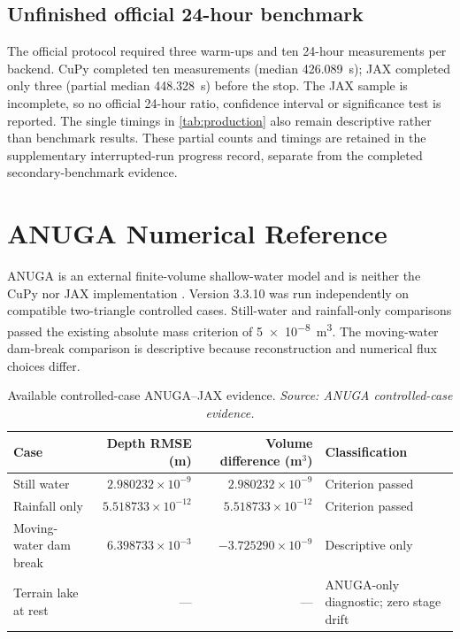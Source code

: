 \documentclass[11pt,a4paper,oneside]{report}
\newcommand{\anugasource}{\textit{Source: ANUGA controlled-case evidence.}}
\begin{document}
\newpage

\section{Unfinished official 24-hour benchmark}
\enlargethispage{4\baselineskip}
The official protocol required three warm-ups and ten 24-hour measurements per backend.
CuPy completed ten measurements (median \SI{426.089}{\second}); JAX completed only three
(partial median \SI{448.328}{\second}) before the stop. The JAX sample is incomplete, so no
official 24-hour ratio, confidence interval or significance test is reported. The single
timings in \cref{tab:production} also remain descriptive rather than benchmark results. These
partial counts and timings are retained in the supplementary interrupted-run progress record,
separate from the completed secondary-benchmark evidence.

\chapter{ANUGA Numerical Reference}\label{chap:anuga}
ANUGA is an external finite-volume shallow-water model and is neither the CuPy nor JAX
implementation \cite{anuga,zoppou1999}. Version 3.3.10 was run independently on compatible
two-triangle controlled cases. Still-water and rainfall-only comparisons passed the existing
absolute mass criterion of \SI{5e-8}{\cubic\metre}. The moving-water dam-break comparison is
descriptive because reconstruction and numerical flux choices differ.

\begin{table}[H]
\centering
\caption[Controlled-case ANUGA--JAX evidence.]{Available controlled-case ANUGA--JAX
evidence. \anugasource}
\label{tab:anuga}
\footnotesize
\begin{tabularx}{\textwidth}{|X|r|r|X|}
\hline
\textbf{Case} & \textbf{Depth RMSE (m)} & \textbf{Volume difference (m$^3$)} &
\textbf{Classification} \\
\hline\hline
Still water & $2.980232\times10^{-9}$ & $2.980232\times10^{-9}$ & Criterion passed \\ \hdashline[0.4pt/1.2pt]
Rainfall only & $5.518733\times10^{-12}$ & $5.518733\times10^{-12}$ & Criterion passed \\ \hdashline[0.4pt/1.2pt]
Moving-water dam break & $6.398733\times10^{-3}$ & $-3.725290\times10^{-9}$ & Descriptive only \\ \hdashline[0.4pt/1.2pt]
Terrain lake at rest & --- & --- & ANUGA-only diagnostic; zero stage drift \\
\hline
\end{tabularx}
\end{table}
\end{document}
